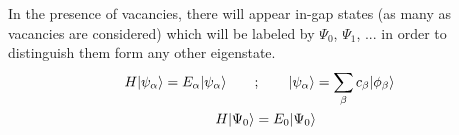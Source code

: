 In the presence of vacancies, there will appear in-gap states (as many as vacancies are considered) which will be labeled by $\Psi_0$, $\Psi_1$, ... in order to distinguish them form any other eigenstate.
\begin{equation}
\begin{split}
  H|\psi_\alpha\rangle = E_\alpha|\psi_\alpha\rangle \qquad&;\qquad
|\psi_\alpha\rangle = \sum_\beta c_\beta|\phi_\beta\rangle\\
  H|\Psi_0\rangle &= E_0|\Psi_0\rangle
\end{split}
\end{equation}

%  
%  
%  
%  
%  
